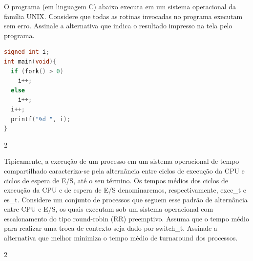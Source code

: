 %
%
%
{
\def\AMCbeginQuestion#1#2{\par\noindent{\bf (POSCOMP 2022 - Questão 46)}}
\begin{question}{} O programa (em linguagem C) abaixo executa em um sistema operacional da família UNIX. Considere que todas as rotinas invocadas no programa executam sem erro. Assinale a alternativa que indica o resultado impresso na tela pelo programa.
\begin{lstlisting}[language=C]
signed int i;
int main(void){
  if (fork() > 0)
	i++;
  else
	i++;
  i++;
  printf("%d ", i);
}
\end{lstlisting}

\begin{multicols}{2}
\begin{choices}
\end{choices}
\end{multicols}
\end{question}
}
%
%
%
{
\def\AMCbeginQuestion#1#2{\par\noindent{\bf (POSCOMP 2025 - Questão 42)}}
\begin{question}{} Tipicamente, a execução de um processo em um sistema operacional de tempo compartilhado caracteriza-se pela alternância entre ciclos de execução da CPU e ciclos de espera de E/S, até o seu término. Os tempos médios dos ciclos de execução da CPU e de espera de E/S denominaremos, respectivamente, exec\_t e es\_t. Considere um conjunto de processos que seguem esse padrão de alternância entre CPU e E/S, os quais executam sob um sistema operacional com escalonamento do tipo round-robin (RR) preemptivo. Assuma que o tempo médio para realizar uma troca de contexto seja dado por switch\_t. Assinale a alternativa que melhor minimiza o tempo médio de turnaround dos processos.
	

\begin{multicols}{2}
\begin{choices}
\end{choices}
\end{multicols}
\end{question}
}
